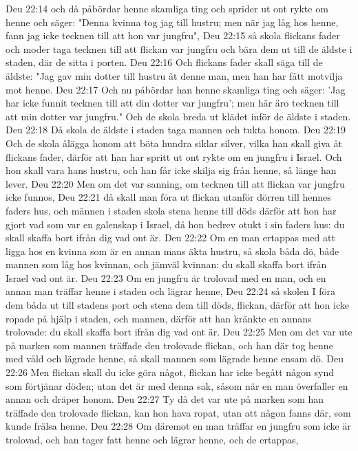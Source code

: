 Deu 22:14  och då påbördar henne skamliga ting och sprider ut ont rykte om henne och säger: "Denna kvinna tog jag till hustru; men när jag låg hos henne, fann jag icke tecknen till att hon var jungfru",
Deu 22:15  så skola flickans fader och moder taga tecknen till att flickan var jungfru och bära dem ut till de äldste i staden, där de sitta i porten.
Deu 22:16  Och flickans fader skall säga till de äldste: "Jag gav min dotter till hustru åt denne man, men han har fått motvilja mot henne.
Deu 22:17  Och nu påbördar han henne skamliga ting och säger: 'Jag har icke funnit tecknen till att din dotter var jungfru'; men här äro tecknen till att min dotter var jungfru." Och de skola breda ut klädet inför de äldste i staden.
Deu 22:18  Då skola de äldste i staden taga mannen och tukta honom.
Deu 22:19  Och de skola ålägga honom att böta hundra siklar silver, vilka han skall giva åt flickans fader, därför att han har spritt ut ont rykte om en jungfru i Israel. Och hon skall vara hans hustru, och han får icke skilja sig från henne, så länge han lever.
Deu 22:20  Men om det var sanning, om tecknen till att flickan var jungfru icke funnos,
Deu 22:21  då skall man föra ut flickan utanför dörren till hennes faders hus, och männen i staden skola stena henne till döds därför att hon har gjort vad som var en galenskap i Israel, då hon bedrev otukt i sin faders hus: du skall skaffa bort ifrån dig vad ont är.
Deu 22:22  Om en man ertappas med att ligga hos en kvinna som är en annan mans äkta hustru, så skola båda dö, både mannen som låg hos kvinnan, och jämväl kvinnan: du skall skaffa bort ifrån Israel vad ont är.
Deu 22:23  Om en jungfru är trolovad med en man, och en annan man träffar henne i staden och lägrar henne,
Deu 22:24  så skolen I föra dem båda ut till stadens port och stena dem till döds, flickan, därför att hon icke ropade på hjälp i staden, och mannen, därför att han kränkte en annans trolovade: du skall skaffa bort ifrån dig vad ont är.
Deu 22:25  Men om det var ute på marken som mannen träffade den trolovade flickan, och han där tog henne med våld och lägrade henne, så skall mannen som lägrade henne ensam dö.
Deu 22:26  Men flickan skall du icke göra något, flickan har icke begått någon synd som förtjänar döden; utan det är med denna sak, såsom när en man överfaller en annan och dräper honom.
Deu 22:27  Ty då det var ute på marken som han träffade den trolovade flickan, kan hon hava ropat, utan att någon fanns där, som kunde frälsa henne.
Deu 22:28  Om däremot en man träffar en jungfru som icke är trolovad, och han tager fatt henne och lägrar henne, och de ertappas,
